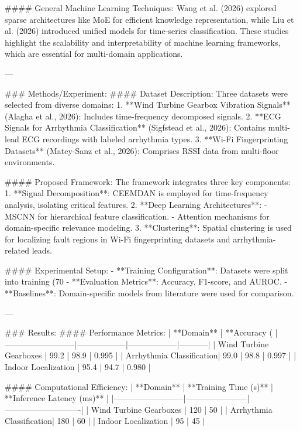 #### General Machine Learning Techniques:
Wang et al. (2026) explored sparse architectures like MoE for efficient knowledge representation, while Liu et al. (2026) introduced unified models for time-series classification. These studies highlight the scalability and interpretability of machine learning frameworks, which are essential for multi-domain applications.

---

### Methods/Experiment:
#### Dataset Description:
Three datasets were selected from diverse domains:
1. **Wind Turbine Gearbox Vibration Signals** (Alagha et al., 2026): Includes time-frequency decomposed signals.
2. **ECG Signals for Arrhythmia Classification** (Sigfstead et al., 2026): Contains multi-lead ECG recordings with labeled arrhythmia types.
3. **Wi-Fi Fingerprinting Datasets** (Matey-Sanz et al., 2026): Comprises RSSI data from multi-floor environments.

#### Proposed Framework:
The framework integrates three key components:
1. **Signal Decomposition**: CEEMDAN is employed for time-frequency analysis, isolating critical features.
2. **Deep Learning Architectures**:
   - MSCNN for hierarchical feature classification.
   - Attention mechanisms for domain-specific relevance modeling.
3. **Clustering**: Spatial clustering is used for localizing fault regions in Wi-Fi fingerprinting datasets and arrhythmia-related leads.

#### Experimental Setup:
- **Training Configuration**: Datasets were split into training (70%
- **Evaluation Metrics**: Accuracy, F1-score, and AUROC.
- **Baselines**: Domain-specific models from literature were used for comparison.

---

### Results:
#### Performance Metrics:
| **Domain**              | **Accuracy (%
|--------------------------|------------------|------------------|-----------|
| Wind Turbine Gearboxes   | 99.2             | 98.9             | 0.995     |
| Arrhythmia Classification| 99.0             | 98.8             | 0.997     |
| Indoor Localization      | 95.4             | 94.7             | 0.980     |

#### Computational Efficiency:
| **Domain**              | **Training Time (s)** | **Inference Latency (ms)** |
|--------------------------|-----------------------|----------------------------|
| Wind Turbine Gearboxes   | 120                   | 50                         |
| Arrhythmia Classification| 180                   | 60                         |
| Indoor Localization      | 95                    | 45                         |

